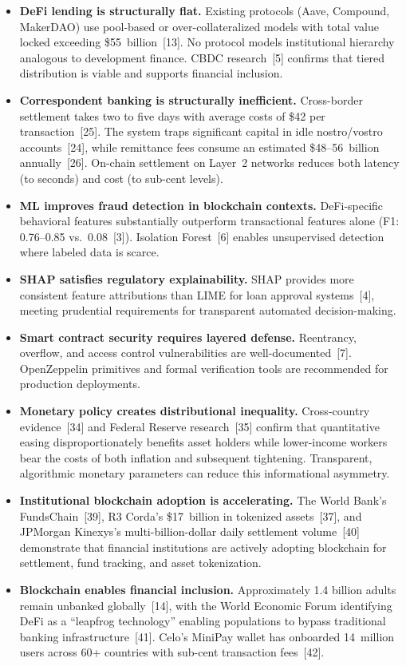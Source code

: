 \documentclass[12pt,a4paper]{report}
\begin{document}
\begin{itemize}[noitemsep]
\item \textbf{DeFi lending is structurally flat.} Existing protocols (Aave, Compound, MakerDAO) use pool-based or over-collateralized models with total value locked exceeding \$55~billion~[13]. No protocol models institutional hierarchy analogous to development finance. CBDC research~[5] confirms that tiered distribution is viable and supports financial inclusion.
\item \textbf{Correspondent banking is structurally inefficient.} Cross-border settlement takes two to five days with average costs of \$42 per transaction~[25]. The system traps significant capital in idle nostro/vostro accounts~[24], while remittance fees consume an estimated \$48--56~billion annually~[26]. On-chain settlement on Layer~2 networks reduces both latency (to seconds) and cost (to sub-cent levels).
\item \textbf{ML improves fraud detection in blockchain contexts.} DeFi-specific behavioral features substantially outperform transactional features alone (F1: 0.76--0.85 vs.\ 0.08~[3]). Isolation Forest~[6] enables unsupervised detection where labeled data is scarce.
\item \textbf{SHAP satisfies regulatory explainability.} SHAP provides more consistent feature attributions than LIME for loan approval systems~[4], meeting prudential requirements for transparent automated decision-making.
\item \textbf{Smart contract security requires layered defense.} Reentrancy, overflow, and access control vulnerabilities are well-documented~[7]. OpenZeppelin primitives and formal verification tools are recommended for production deployments.
\item \textbf{Monetary policy creates distributional inequality.} Cross-country evidence~[34] and Federal Reserve research~[35] confirm that quantitative easing disproportionately benefits asset holders while lower-income workers bear the costs of both inflation and subsequent tightening. Transparent, algorithmic monetary parameters can reduce this informational asymmetry.
\item \textbf{Institutional blockchain adoption is accelerating.} The World Bank's FundsChain~[39], R3 Corda's \$17~billion in tokenized assets~[37], and JPMorgan Kinexys's multi-billion-dollar daily settlement volume~[40] demonstrate that financial institutions are actively adopting blockchain for settlement, fund tracking, and asset tokenization.
\item \textbf{Blockchain enables financial inclusion.} Approximately 1.4 billion adults remain unbanked globally~[14], with the World Economic Forum identifying DeFi as a ``leapfrog technology'' enabling populations to bypass traditional banking infrastructure~[41]. Celo's MiniPay wallet has onboarded 14~million users across 60+ countries with sub-cent transaction fees~[42].
\end{itemize}
\end{document}
